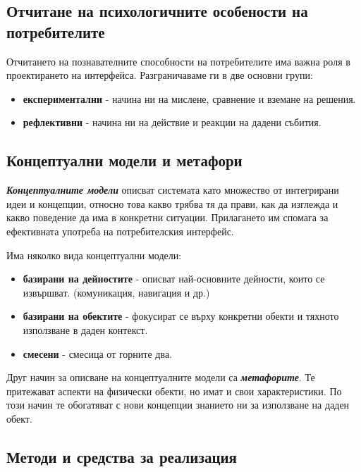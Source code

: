 \documentclass[fleqn,12pt]{article}
\begin{document}
\subsection{Отчитане на психологичните особености на потребителите}

Отчитането на познавателните способности на потребителите има важна роля в проектирането на интерфейса.
Разграничаваме ги в две основни групи: %
\begin{itemize}
    \item \textbf{експериментални} -  начина ни на мислене, сравнение и вземане на решения.
    \item \textbf{рефлективни} - начина ни на действие и реакции на дадени събития.
\end{itemize}

\subsection{Концептуални модели и метафори}

\textbf{\textit{Концептуалните модели}} описват системата като множество от интегрирани идеи и концепции, относно това какво трябва тя да прави, как да изглежда и какво поведение да има в конкретни ситуации.
Прилагането им спомага за ефективната употреба на потребителския интерфейс.
\bigbreak

Има няколко вида концептуални модели:
\begin{itemize}
    \item \textbf{базирани на дейностите} - описват най-основните дейности, които се извършват. (комуникация, навигация и др.)
    \item \textbf{базирани на обектите} - фокусират се върху конкретни обекти и тяхното използване в даден контекст.
    \item \textbf{смесени} - смесица от горните два.
\end{itemize}

Друг начин за описване на концептуалните модели са \textbf{\textit{метафорите}}.
Те притежават аспекти на физически обекти, но имат и свои характеристики.
По този начин те обогатяват с нови концепции знанието ни за използване на даден обект.

\subsection{Методи и средства за реализация}
\end{document}
